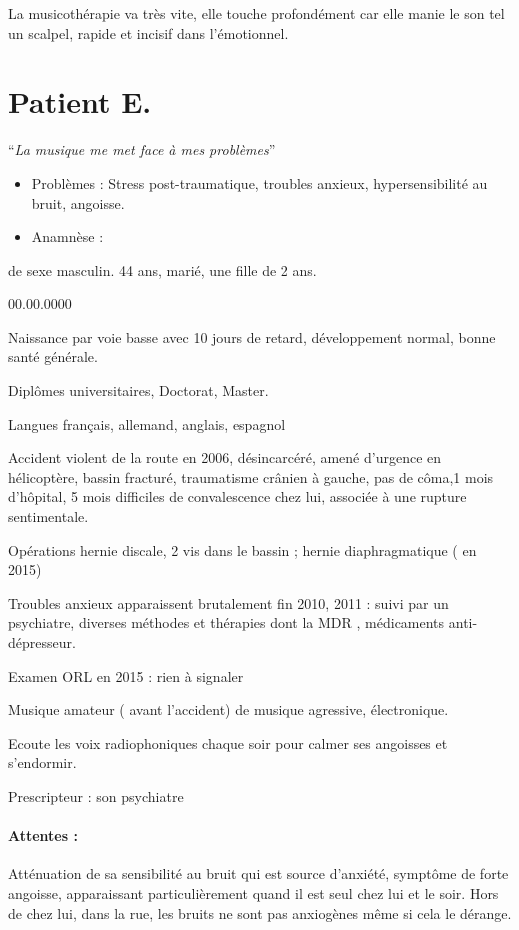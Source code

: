 La musicothérapie va très vite, elle touche profondément car elle
manie le son tel un scalpel, rapide et incisif dans l'émotionnel.

\section{Patient E.}

``\emph{La musique me met face à mes problèmes}''
\begin{itemize}
\item Problèmes : Stress post-traumatique, troubles anxieux, hypersensibilité
au bruit, angoisse.
\item Anamnèse : 
\end{itemize}
de sexe masculin. 44 ans, marié, une fille de 2 ans.
\begin{lyxlist}{00.00.0000}
\item [{Naissance}] par voie basse avec 10 jours de retard, développement
normal, bonne santé générale.
\item [{Diplômes}] universitaires, Doctorat, Master.
\item [{Langues}] français, allemand, anglais, espagnol
\item [{Accident}] violent de la route en 2006, désincarcéré, amené d'urgence
en hélicoptère, bassin fracturé, traumatisme crânien à gauche, pas
de côma,1 mois d'hôpital, 5 mois difficiles de convalescence chez
lui, associée à une rupture sentimentale.
\item [{Opérations}] hernie discale, 2 vis dans le bassin ; hernie diaphragmatique
( en 2015)
\item [{Troubles}] anxieux apparaissent brutalement fin 2010, 2011 : suivi
par un psychiatre, diverses méthodes et thérapies dont la MDR , médicaments
anti-dépresseur.
\item [{Examen}] ORL en 2015 : rien à signaler
\item [{Musique}] amateur ( avant l'accident) de musique agressive, électronique. 
\item [{Ecoute}] les voix radiophoniques chaque soir pour calmer ses angoisses
et s'endormir.
\item [{Prescripteur}] : son psychiatre
\end{lyxlist}

\paragraph{Attentes : }

Atténuation de sa sensibilité au bruit qui est source d'anxiété, symptôme
de forte angoisse, apparaissant particulièrement quand il est seul
chez lui et le soir. Hors de chez lui, dans la rue, les bruits ne
sont pas anxiogènes même si cela le dérange.

